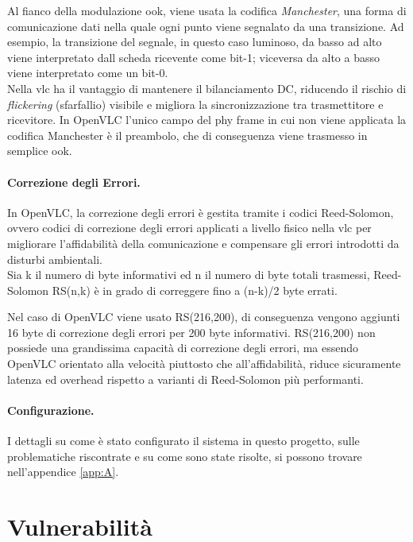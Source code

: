 Al fianco della modulazione \gls{ook}, viene usata la codifica \textit{Manchester}, una forma di comunicazione dati nella quale ogni punto viene segnalato da una transizione. Ad esempio, la transizione del segnale, in questo caso luminoso, da basso ad alto viene interpretato dall scheda ricevente come bit-1; viceversa da alto a basso viene interpretato come un bit-0.\\
Nella \gls{vlc} ha il vantaggio di mantenere il bilanciamento DC, riducendo il rischio di \textit{flickering} (sfarfallio) visibile e migliora la sincronizzazione tra trasmettitore e ricevitore.
In OpenVLC l'unico campo del \gls{phy} frame in cui non viene applicata la codifica Manchester è il preambolo, che di conseguenza viene trasmesso in semplice \gls{ook}.

\paragraph{Correzione degli Errori.}
In OpenVLC, la correzione degli errori è gestita tramite i codici Reed-Solomon, ovvero codici di correzione degli errori applicati a livello fisico nella \gls{vlc} per migliorare l'affidabilità della comunicazione e compensare gli errori introdotti da disturbi ambientali.\\
Sia k il numero di byte informativi ed n il numero di byte totali trasmessi, Reed-Solomon RS(n,k) è in grado di correggere fino a (n-k)/2 byte errati.

Nel caso di OpenVLC viene usato RS(216,200), di conseguenza vengono aggiunti 16 byte di correzione degli errori per 200 byte informativi. RS(216,200) non possiede una grandissima capacità di correzione degli errori, ma essendo OpenVLC orientato alla velocità piuttosto che all'affidabilità, riduce sicuramente latenza ed overhead rispetto a varianti di Reed-Solomon più performanti.

\paragraph{Configurazione.}
I dettagli su come è stato configurato il sistema in questo progetto, sulle problematiche riscontrate e su come sono state risolte, si possono trovare nell'appendice \ref{app:A}.


\section{Vulnerabilità}

